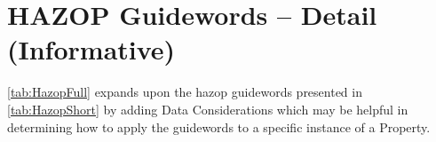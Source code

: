 %
%
\section{HAZOP Guidewords -- Detail (Informative)} \label{bkm:guidewords}


\autoref{tab:HazopFull}
expands upon the \gls{hazop} guidewords presented in \autoref{tab:HazopShort} by adding Data Considerations which may be helpful in determining how to apply the guidewords to a specific instance of a Property.

